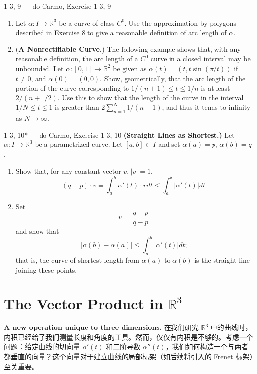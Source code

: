 \begin{exercise}{1-3, 9 — do Carmo, Exercise 1-3, 9}
\begin{enumerate}
\item[a.] Let $\alpha: I \to \mathbb{R}^3$ be a curve of class $C^0$. Use the approximation by polygons described in Exercise 8 to give a reasonable definition of arc length of $\alpha$.

\item[b.] (\textbf{A Nonrectifiable Curve.}) The following example shows that, with any reasonable definition, the arc length of a $C^0$ curve in a closed interval may be unbounded. Let $\alpha: [0,1] \to \mathbb{R}^2$ be given as $\alpha(t) = (t, t\sin(\pi/t))$ if $t \neq 0$, and $\alpha(0) = (0,0)$. Show, geometrically, that the arc length of the portion of the curve corresponding to $1/(n+1) \leq t \leq 1/n$ is at least $2/(n + 1/2)$. Use this to show that the length of the curve in the interval $1/N \leq t \leq 1$ is greater than $2\sum_{n=1}^N 1/(n+1)$, and thus it tends to infinity as $N \to \infty$.
\end{enumerate}
\end{exercise}

\begin{exercise}{1-3, 10* — do Carmo, Exercise 1-3, 10}
\textbf{(Straight Lines as Shortest.)} Let $\alpha: I \to \mathbb{R}^3$ be a parametrized curve. Let $[a, b] \subset I$ and set $\alpha(a) = p$, $\alpha(b) = q$.
\begin{enumerate}
\item[a.] Show that, for any constant vector $v$, $|v| = 1$,
\[
(q - p) \cdot v = \int_a^b \alpha'(t) \cdot v dt \leq \int_a^b |\alpha'(t)| dt.
\]
\item[b.] Set
\[
v = \frac{q - p}{|q - p|}
\]
and show that
\[
|\alpha(b) - \alpha(a)| \leq \int_a^b |\alpha'(t)| dt;
\]
that is, the curve of shortest length from $\alpha(a)$ to $\alpha(b)$ is the straight line joining these points.
\end{enumerate}
\end{exercise}

\section{The Vector Product in $\mathbb{R}^3$}\label{sec:vector-product-ch1}

\textbf{A new operation unique to three dimensions.} 在我们研究 $\mathbb{R}^3$ 中的曲线时，内积已经给了我们测量长度和角度的工具。然而，仅仅有内积是不够的。考虑一个问题：给定曲线的切向量 $\alpha'(t)$ 和二阶导数 $\alpha''(t)$，我们如何构造一个与两者都垂直的向量？这个向量对于建立曲线的局部标架（如后续将引入的 Frenet 标架）至关重要。

